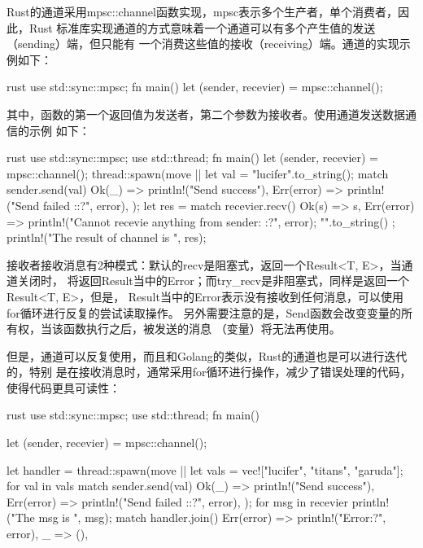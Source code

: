 Rust的通道采用mpsc::channel函数实现，mpsc表示多个生产者，单个消费者，因此，Rust
标准库实现通道的方式意味着一个通道可以有多个产生值的发送（sending）端，但只能有
一个消费这些值的接收（receiving）端。通道的实现示例如下：
\begin{code-block}{rust}
use std::sync::mpsc;
fn main() {
    let (sender, recevier) = mpsc::channel();
}
\end{code-block}
其中，函数的第一个返回值为发送者，第二个参数为接收者。使用通道发送数据通信的示例
如下：
\begin{code-block}{rust}
use std::sync::mpsc;
use std::thread;
fn main() {
    let (sender, recevier) = mpsc::channel();
    thread::spawn(move || {
        let val = "lucifer".to_string();
        match sender.send(val) {
            Ok(_) => println!("Send success"),
            Err(error) => println!("Send failed :{:?}", error),
        }
    });
    let res = match recevier.recv() {
        Ok(s) => s,
        Err(error) => {
            println!("Cannot recevie anything from sender: {:?}", error);
            "".to_string()
        }
    };
    println!("The result of channel is {}", res);
}
\end{code-block}
接收者接收消息有2种模式：默认的recv是阻塞式，返回一个Result<T, E>，当通道关闭时，
将返回Result当中的Error；而try\_recv是非阻塞式，同样是返回一个Result<T, E>，但是，
Result当中的Error表示没有接收到任何消息，可以使用for循环进行反复的尝试读取操作。
另外需要注意的是，Send函数会改变变量的所有权，当该函数执行之后，被发送的消息
（变量）将无法再使用。

但是，通道可以反复使用，而且和Golang的类似，Rust的通道也是可以进行迭代的，特别
是在接收消息时，通常采用for循环进行操作，减少了错误处理的代码，使得代码更具可读性：
\begin{code-block}{rust}
use std::sync::mpsc;
use std::thread;
fn main() {
    let (sender, recevier) = mpsc::channel();

    let handler = thread::spawn(move || {
        let vals = vec!["lucifer", "titans", "garuda"];
        for val in vals {
            match sender.send(val) {
                Ok(_) => println!("Send success"),
                Err(error) => println!("Send failed :{:?}", error),
            }
        }
    });
    for msg in recevier {
        println!("The msg is {}", msg);
    }
    match handler.join() {
        Err(error) => println!("Error{:?}", error),
        _ => (),
    }
}
\end{code-block}

